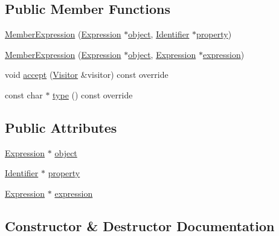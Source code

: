 \subsection*{Public Member Functions}
\begin{DoxyCompactItemize}
\item 
\hyperlink{struct_member_expression_ad005a695e47f49f03a6f6412da9a2219}{Member\+Expression} (\hyperlink{struct_expression}{Expression} $\ast$\hyperlink{struct_member_expression_a338f9515daed926c07fd717b9b728f58}{object}, \hyperlink{struct_identifier}{Identifier} $\ast$\hyperlink{struct_member_expression_aacf14f0ff4ff8cb0cf5346afc3b97470}{property})
\item 
\hyperlink{struct_member_expression_aa14ba789623f83a9aaab2d437bf18c90}{Member\+Expression} (\hyperlink{struct_expression}{Expression} $\ast$\hyperlink{struct_member_expression_a338f9515daed926c07fd717b9b728f58}{object}, \hyperlink{struct_expression}{Expression} $\ast$\hyperlink{struct_member_expression_a81b4f3183db07b7b9350f9199ce5fc97}{expression})
\item 
void \hyperlink{struct_member_expression_a04c3360eda4db02e733746882830b92c}{accept} (\hyperlink{struct_visitor}{Visitor} \&visitor) const override
\item 
const char $\ast$ \hyperlink{struct_member_expression_a2b3653ea6c4b7447d3eebf21d528d847}{type} () const override
\end{DoxyCompactItemize}
\subsection*{Public Attributes}
\begin{DoxyCompactItemize}
\item 
\hyperlink{struct_expression}{Expression} $\ast$ \hyperlink{struct_member_expression_a338f9515daed926c07fd717b9b728f58}{object}
\item 
\hyperlink{struct_identifier}{Identifier} $\ast$ \hyperlink{struct_member_expression_aacf14f0ff4ff8cb0cf5346afc3b97470}{property}
\item 
\hyperlink{struct_expression}{Expression} $\ast$ \hyperlink{struct_member_expression_a81b4f3183db07b7b9350f9199ce5fc97}{expression}
\end{DoxyCompactItemize}


\subsection{Constructor \& Destructor Documentation}
\mbox{\label{struct_member_expression_ad005a695e47f49f03a6f6412da9a2219}} 
